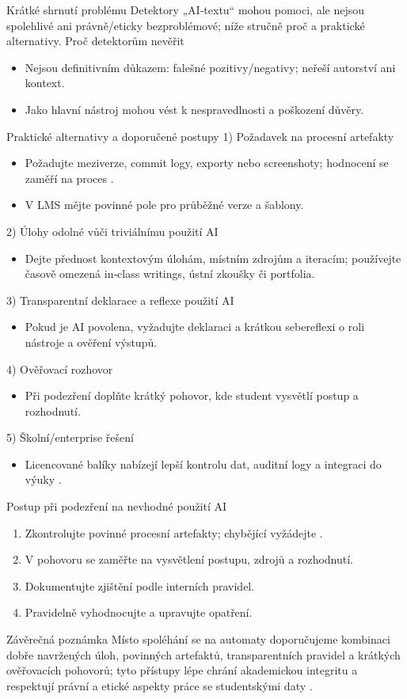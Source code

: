 \documentclass{report}%
\begin{document}
%
Krátké shrnutí problému
Detektory „AI‑textu“ mohou pomoci, ale nejsou spolehlivé ani právně/eticky bezproblémové; níže stručně proč a praktické alternativy.
Proč detektorům nevěřit \begin{itemize}
  \item Nejsou definitivním důkazem: falešné pozitivy/negativy; neřeší autorství ani kontext.
  \item Jako hlavní nástroj mohou vést k nespravedlnosti a poškození důvěry.
\end{itemize}
Praktické alternativy a doporučené postupy
1) Požadavek na procesní artefakty \begin{itemize}
  \item Požadujte meziverze, commit logy, exporty nebo screenshoty; hodnocení se zaměří na proces \cite{kb_ai_101_tipu_pdf_04e4a115_page_8_1}.
  \item V LMS mějte povinné pole pro průběžné verze a šablony.
\end{itemize}
2) Úlohy odolné vůči triviálnímu použití AI \begin{itemize}
  \item Dejte přednost kontextovým úlohám, místním zdrojům a iteracím; používejte časově omezená in‑class writings, ústní zkoušky či portfolia.
\end{itemize}
3) Transparentní deklarace a reflexe použití AI \begin{itemize}
  \item Pokud je AI povolena, vyžadujte deklaraci a krátkou sebereflexi o roli nástroje a ověření výstupů.
\end{itemize}
4) Ověřovací rozhovor \begin{itemize}
  \item Při podezření doplňte krátký pohovor, kde student vysvětlí postup a rozhodnutí.
\end{itemize}
5) Školní/enterprise řešení \begin{itemize}
  \item Licencované balíky nabízejí lepší kontrolu dat, auditní logy a integraci do výuky \cite{kb_ai_101_tipu_pdf_04e4a115_page_36_1, kb_ai_101_tipu_pdf_04e4a115_page_15_2}.
\end{itemize}
Postup při podezření na nevhodné použití AI \begin{enumerate}
  \item Zkontrolujte povinné procesní artefakty; chybějící vyžádejte \cite{kb_ai_101_tipu_pdf_04e4a115_page_8_1}.
  \item V pohovoru se zaměřte na vysvětlení postupu, zdrojů a rozhodnutí.
  \item Dokumentujte zjištění podle interních pravidel.
  \item Pravidelně vyhodnocujte a upravujte opatření.
\end{enumerate}
Závěrečná poznámka
Místo spoléhání se na automaty doporučujeme kombinaci dobře navržených úloh, povinných artefaktů, transparentních pravidel a krátkých ověřovacích pohovorů; tyto přístupy lépe chrání akademickou integritu a respektují právní a etické aspekty práce se studentskými daty \cite{kb_ai_101_tipu_pdf_04e4a115_page_8_1, kb_ai_101_tipu_pdf_04e4a115_page_36_1, kb_ai_101_tipu_pdf_04e4a115_page_15_2}.%
\end{document}

